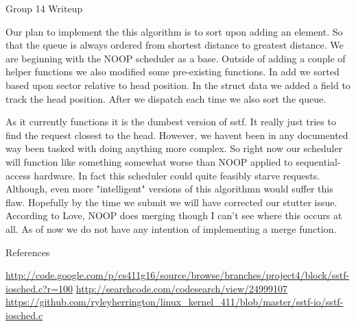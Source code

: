 \documentclass[letterpaper,10pt,twocolumn,titlepage]{article}
\begin{document}
	\begin{center}
	Group 14 Writeup	
	\end{center}
	Our plan to implement the this algorithm is to sort upon adding	an element. So that the queue is always ordered from shortest distance to greatest	distance. We are beginning with the NOOP scheduler as a base. Outside of adding	a couple of helper functions we also modified some pre-existing functions. In	add we sorted based upon sector relative to head position. In the struct data we added a field to track	the head position. After we dispatch each time we also sort the queue.

	As it currently functions it is the dumbest version of sstf. It really just tries to find the request closest to the head. However, we havent been in any documented way been tasked with doing anything more complex. So right now our scheduler will function like something somewhat worse than NOOP applied to sequential-access hardware. In fact this scheduler could quite feasibly starve requests. Although, even more	"intelligent" versions of this algorithmn would suffer this flaw. Hopefully by the time we submit we will have corrected our stutter issue. According to Love, NOOP does merging though I can't see where this occurs at all. As of now we do not have any intention of implementing a merge function. 

	\begin{center}
	References	
	\end{center}
	\url{http://code.google.com/p/cs411g16/source/browse/branches/project4/block/sstf-iosched.c?r=100}
	\url{http://searchcode.com/codesearch/view/24999107 }
	\url{https://github.com/ryleyherrington/linux_kernel_411/blob/master/sstf-io/sstf-iosched.c}
\end{document}
